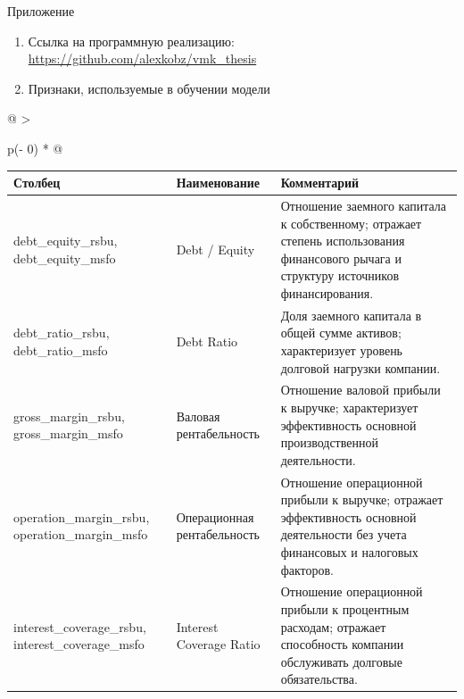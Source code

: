 \documentclass[
]{article}
\newcounter{none} %
\begin{document}
Приложение

\begin{enumerate}
\def\labelenumi{\arabic{enumi}.}
\item
  Ссылка на программную реализацию: \url{https://github.com/alexkobz/vmk_thesis}
\item
  Признаки, используемые в обучении модели
\end{enumerate}

{\def\LTcaptype{none} %
\begin{longtable}[]{@{}
  >{\raggedright\arraybackslash}p{}@{}}
\toprule\noalign{}
\begin{minipage}[b]{\linewidth}\raggedright
{\def\LTcaptype{none} %
\begin{longtable}[]{@{}
  >{\raggedright\arraybackslash}p{}
  >{\raggedright\arraybackslash}p{}
  >{\raggedright\arraybackslash}p{}@{}}
\toprule\noalign{}
\begin{minipage}[b]{\linewidth}\raggedright
Столбец
\end{minipage} & \begin{minipage}[b]{\linewidth}\raggedright
Наименование
\end{minipage} & \begin{minipage}[b]{\linewidth}\raggedright
Комментарий
\end{minipage} \\
\midrule\noalign{}
\endhead
\bottomrule\noalign{}
\endlastfoot
debt\_equity\_rsbu, debt\_equity\_msfo & Debt / Equity & Отношение заемного капитала к собственному; отражает степень использования финансового рычага и структуру источников финансирования. \\
debt\_ratio\_rsbu, debt\_ratio\_msfo & Debt Ratio & Доля заемного капитала в общей сумме активов; характеризует уровень долговой нагрузки компании. \\
gross\_margin\_rsbu, gross\_margin\_msfo & Валовая рентабельность & Отношение валовой прибыли к выручке; характеризует эффективность основной производственной деятельности. \\
operation\_margin\_rsbu, operation\_margin\_msfo & Операционная рентабельность & Отношение операционной прибыли к выручке; отражает эффективность основной деятельности без учета финансовых и налоговых факторов. \\
interest\_coverage\_rsbu, interest\_coverage\_msfo & Interest Coverage Ratio & Отношение операционной прибыли к процентным расходам; отражает способность компании обслуживать долговые обязательства. \\

\end{longtable}}
\end{minipage}
\end{longtable}}
\end{document}
